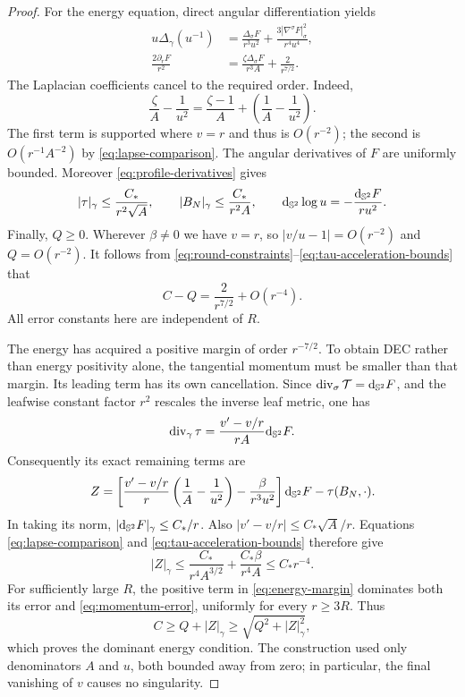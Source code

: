 \begin{proof}
For the energy equation, direct angular differentiation yields
\begin{equation}\label{eq:laplacian-cancellation}
 \begin{split}
 u\Delta_\gamma(u^{-1})
   &=\frac{\Delta_\sigma F}{r^3u^2}
      +\frac{3|\nabla^\sigma F|_\sigma^2}{r^4u^4},\\
 \frac{2\partial_rF}{r^2}
   &=\frac{\zeta\Delta_\sigma F}{r^3A}+\frac{2}{r^{7/2}}.
 \end{split}
\end{equation}
The Laplacian coefficients cancel to the required order. Indeed,
\[
 \frac\zeta A-\frac1{u^2}
   =\frac{\zeta-1}{A}+\left(\frac1A-\frac1{u^2}\right).
\]
The first term is supported where $v=r$ and thus is $O(r^{-2})$;
the second is $O(r^{-1}A^{-2})$ by
\eqref{eq:lapse-comparison}. The angular derivatives of $F$ are
uniformly bounded. Moreover \eqref{eq:profile-derivatives} gives
\begin{equation}\label{eq:tau-acceleration-bounds}
 |\tau|_\gamma\leq\frac{C_*}{r^2\sqrt A},\qquad
 |B_N|_\gamma\leq\frac{C_*}{r^2 A},\qquad
 \mathrm d_{\mathbb S^2}\log u=-\frac{\mathrm d_{\mathbb S^2}F}{ru^2}.
\end{equation}
Finally, $Q\geq0$. Wherever $\beta\ne0$ we have $v=r$, so
$|v/u-1|=O(r^{-2})$ and $Q=O(r^{-2})$. It follows from
\eqref{eq:round-constraints}--\eqref{eq:tau-acceleration-bounds}
that
\begin{equation}\label{eq:energy-margin}
 C-Q=\frac{2}{r^{7/2}}+O(r^{-4}).
\end{equation}
All error constants here are independent of $R$.

The energy has acquired a positive margin of order $r^{-7/2}$.
To obtain DEC rather than energy positivity alone, the tangential
momentum must be smaller than that margin. Its leading term has its
own cancellation. Since
$\operatorname{div}_\sigma\mathcal T=\mathrm d_{\mathbb S^2}F$, and the leafwise constant
factor $r^2$ rescales the inverse leaf metric, one has
\[
 \operatorname{div}_\gamma\tau=\frac{v'-v/r}{rA}\mathrm d_{\mathbb S^2}F.
\]
Consequently its exact remaining terms are
\begin{equation}\label{eq:gradient-cancellation}
 Z=\left[
       \frac{v'-v/r}{r}\left(\frac1A-\frac1{u^2}\right)
       -\frac{\beta}{r^3u^2}
     \right]\mathrm d_{\mathbb S^2}F-\tau(B_N,\cdot).
\end{equation}
In taking its norm, $|\mathrm d_{\mathbb S^2}F|_\gamma\leq C_*/r$.
Also $|v'-v/r|\leq C_*\sqrt A/r$. Equations
\eqref{eq:lapse-comparison} and
\eqref{eq:tau-acceleration-bounds} therefore give
\begin{equation}\label{eq:momentum-error}
 |Z|_\gamma
 \leq \frac{C_*}{r^4A^{3/2}}+\frac{C_*\beta}{r^4A}
 \leq C_*r^{-4}.
\end{equation}
For sufficiently large $R$, the positive term in
\eqref{eq:energy-margin} dominates both its error and
\eqref{eq:momentum-error}, uniformly for every $r\geq3R$.
Thus
\[
 C\geq Q+|Z|_\gamma
       \geq\sqrt{Q^2+|Z|_\gamma^2},
\]
which proves the dominant energy condition. The construction used
only denominators $A$ and $u$, both bounded away from zero; in
particular, the final vanishing of $v$ causes no singularity.


\end{proof}
